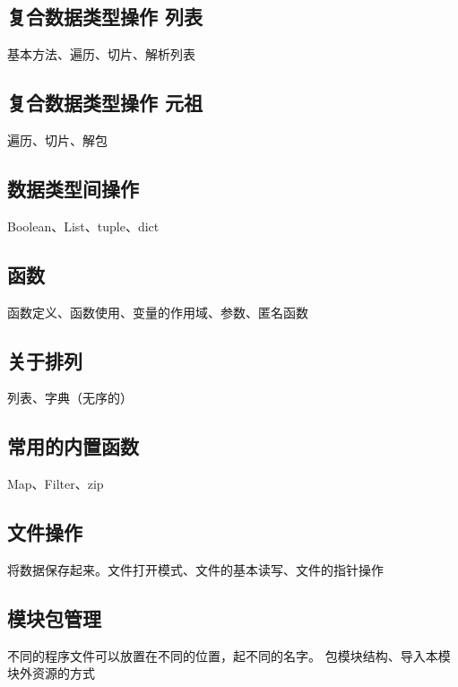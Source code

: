 \documentclass[UTF8]{ctexart}
\begin{document}
\subsection{复合数据类型操作 列表}
基本方法、遍历、切片、解析列表
\subsection{复合数据类型操作 元祖}
遍历、切片、解包
\subsection{数据类型间操作}
Boolean、List、tuple、dict
\subsection{函数}
函数定义、函数使用、变量的作用域、参数、匿名函数
\subsection{关于排列}
列表、字典（无序的）
\subsection{常用的内置函数}
Map、Filter、zip
\subsection{文件操作}
将数据保存起来。文件打开模式、文件的基本读写、文件的指针操作
\subsection{模块包管理}
不同的程序文件可以放置在不同的位置，起不同的名字。
包模块结构、导入本模块外资源的方式
\end{document}

